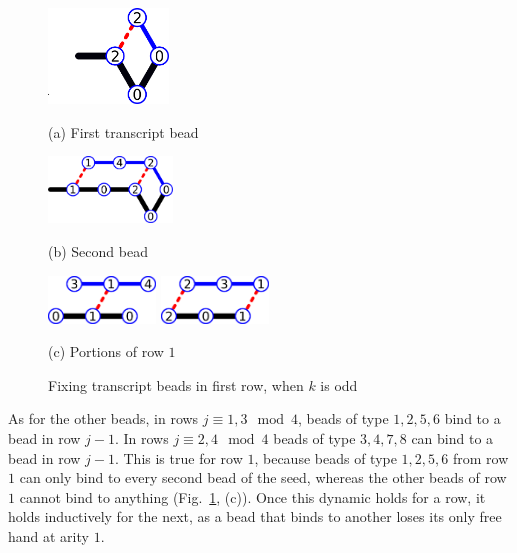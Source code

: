\begin{figure}
	\begin{minipage}{.35\textwidth}
		\centering
		\includegraphics[align=c,height=1in]{./Fig/CI_1n}\\
		\bigskip
		
		(a) First transcript bead 
	\end{minipage}%
	\begin{minipage}{.2\textwidth}
		\centering
		\includegraphics[align=c,height=0.7in]{./Fig/CI_2n}\\
		\bigskip
		
		(b) Second bead
	\end{minipage}
	\begin{minipage}{.4\textwidth}
		\centering
		\includegraphics[align=c,height=0.5in]{./Fig/CI_3n}
		\bigskip
		\vspace{0.1in}
		\includegraphics[align=c,height=0.5in]{./Fig/CI_4n}
		\bigskip
		
		(c) Portions of row $1$
	\end{minipage}
	\caption{Fixing transcript beads in first row, when $k$ is odd}
	\label{CI:1-4}
\end{figure}


As for the other beads, in rows $j\equiv 1,3\mod 4$, beads of type $1,2,5,6$ bind to a bead in row $j-1$. In rows $j\equiv 2,4\mod 4$ beads of type $3,4,7,8$ can bind to a bead in row $j-1$.  This is true for row $1$, because beads of type $1,2,5,6$ from row $1$ can only bind to every second bead of the seed, whereas the other beads of row $1$ cannot bind to anything (Fig.~\ref{CI:1-4}, (c)). Once this dynamic holds for a row, it holds inductively for the next, as a bead that binds to another loses its only free hand at arity $1$.

